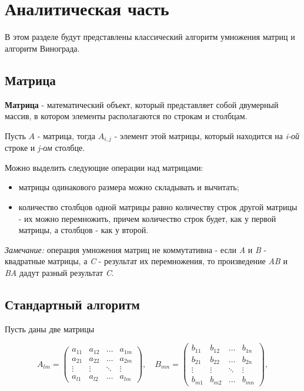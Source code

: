 \chapter{Аналитическая часть}
В этом разделе будут представлены классический алгоритм умножения матриц и алгоритм Винограда.


\section{Матрица}

\textbf{Матрица} \cite{matrix} - математический объект, который представляет собой двумерный массив, в котором элементы располагаются по строкам и столбцам.

Пусть $A$ - матрица, тогда $A_{i,j}$ - элемент этой матрицы, который находится на \textit{i-ой} строке и \textit{j-ом} столбце.

Можно выделить следующие операции над матрицами:
\begin{itemize}
    \item матрицы одинакового размера можно складывать и вычитать;
    \item количество столбцов одной матрицы равно количеству строк другой матрицы - их можно перемножить, причем количество строк будет, как у первой матрицы, а столбцов - как у второй. \newline
\end{itemize}

\textit{Замечание:} операция умножения матриц не коммутативна - если \textit{A} и \textit{B} - квадратные матрицы, а \textit{C} - результат их перемножения, то произведение \textit{AB} и \textit{BA} дадут разный результат \textit{C}.


\section{Стандартный алгоритм}

Пусть даны две матрицы

\begin{equation}
	A_{lm} = \begin{pmatrix}
		a_{11} & a_{12} & \ldots & a_{1m}\\
		a_{21} & a_{22} & \ldots & a_{2m}\\
		\vdots & \vdots & \ddots & \vdots\\
		a_{l1} & a_{l2} & \ldots & a_{lm}
	\end{pmatrix},
	\quad
	B_{mn} = \begin{pmatrix}
		b_{11} & b_{12} & \ldots & b_{1n}\\
		b_{21} & b_{22} & \ldots & b_{2n}\\
		\vdots & \vdots & \ddots & \vdots\\
		b_{m1} & b_{m2} & \ldots & b_{mn}
	\end{pmatrix},
\end{equation}

